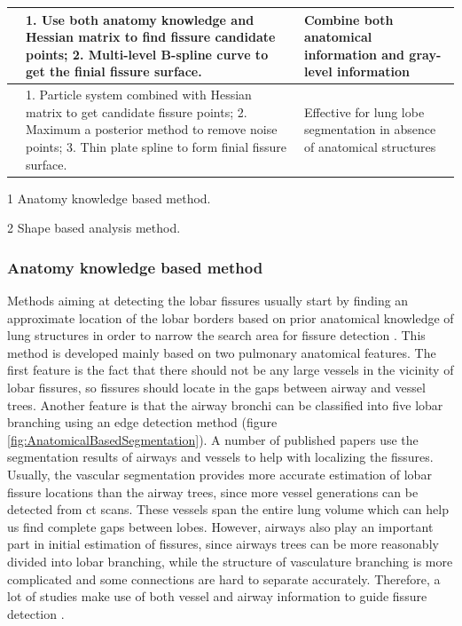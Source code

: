 \begin{table}[htbp]
\begin{threeparttable}
\begin{tabular}{|p{4.3cm}|p{6.3cm}|p{4.8cm}|}
\hline
\cite{doel2012pulmonary} & 1. Use both anatomy knowledge and Hessian matrix to find fissure candidate points; 2. Multi-level B-spline curve to get the finial fissure surface. & Combine both anatomical information and gray-level information\tnote{1,2}\\
\hline
\cite{ross2010automatic,ross2013pulmonary} & 1. Particle system combined with Hessian matrix to get candidate fissure points; 2. Maximum a posterior method to remove noise points; 3. Thin plate spline to form finial fissure surface. & Effective for lung lobe segmentation in absence of anatomical structures\tnote{2}\\
\hline
\end{tabular}
\begin{tablenotes}
        \footnotesize
        \item[1] Anatomy knowledge based method.
        \item[2] Shape based analysis method.
\end{tablenotes}
\end{threeparttable}
\end{table}

\subsubsection{Anatomy knowledge based method}
Methods aiming at detecting the lobar fissures usually start by finding an approximate location of the lobar borders based on prior anatomical knowledge of lung structures in order to narrow the search area for fissure detection \citep{kuhnigk2003lung,kuhnigk2005informatics,zhou2004automatic,saita2006algorithm,zhang2006atlas,ukil2009anatomy,pu2009computational,lassen2010automatic,doel2012pulmonary}. This method is developed mainly based on two pulmonary anatomical features. The first feature is the fact that there should not be any large vessels in the vicinity of lobar fissures, so fissures should locate in the gaps between airway and vessel trees. Another feature is that the airway bronchi can be classified into five lobar branching using an edge detection method (figure \ref{fig:AnatomicalBasedSegmentation}). A number of published papers use the segmentation results of airways and vessels to help with localizing the fissures. Usually, the vascular segmentation provides more accurate estimation of lobar fissure locations than the airway trees, since more vessel generations can be detected from \gls{ct} scans. These vessels span the entire lung volume which can help us find complete gaps between lobes. However, airways also play an important part in initial estimation of fissures, since airways trees can be more reasonably divided into lobar branching, while the structure of vasculature branching is more complicated and some connections are hard to separate accurately. Therefore, a lot of studies make use of both vessel and airway information to guide fissure detection \citep{ukil2009anatomy,lassen2010automatic,doel2012pulmonary}.

